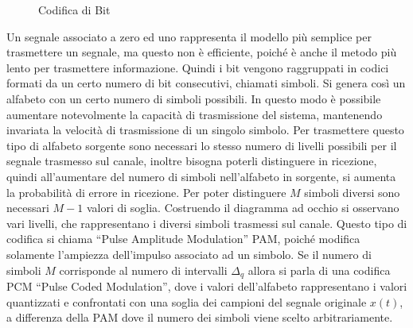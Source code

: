 \documentclass{article}
\numberwithin{equation}{subsection}
\begin{document}
\begin{figure}[H]%
    \centering
    \qquad
    \caption{Codifica di Bit}
\end{figure}
Un segnale associato a zero ed uno rappresenta il modello più semplice per trasmettere un segnale, ma questo non è efficiente, poiché è anche il metodo più lento per 
trasmettere informazione. Quindi i bit vengono raggruppati in codici formati da un certo numero di bit consecutivi, chiamati simboli. Si genera così un alfabeto con un 
certo numero di simboli possibili. In questo modo è possibile aumentare notevolmente la 
capacità di trasmissione del sistema, mantenendo invariata la velocità di trasmissione di un singolo simbolo.  
Per trasmettere questo tipo di alfabeto sorgente sono necessari lo stesso numero di livelli possibili per il segnale trasmesso sul canale, inoltre bisogna poterli distinguere 
in ricezione, quindi all'aumentare del numero di simboli nell'alfabeto in sorgente, si aumenta la probabilità di errore in ricezione. Per poter distinguere $M$ 
simboli diversi sono necessari $M-1$ valori di soglia. Costruendo il diagramma ad occhio si osservano vari livelli, che rappresentano i diversi simboli trasmessi sul canale. Questo tipo di codifica si 
chiama ``Pulse Amplitude Modulation'' PAM, poiché modifica solamente l'ampiezza dell'impulso associato ad un simbolo. Se il numero di simboli $M$ 
corrisponde al numero di intervalli $\Delta_q$ allora si parla di una codifica PCM ``Pulse Coded Modulation'', dove i valori dell'alfabeto rappresentano 
i valori quantizzati e confrontati con una soglia dei campioni del segnale originale $x(t)$, a differenza della PAM dove il numero dei simboli viene scelto 
arbitrariamente. 
\end{document}
